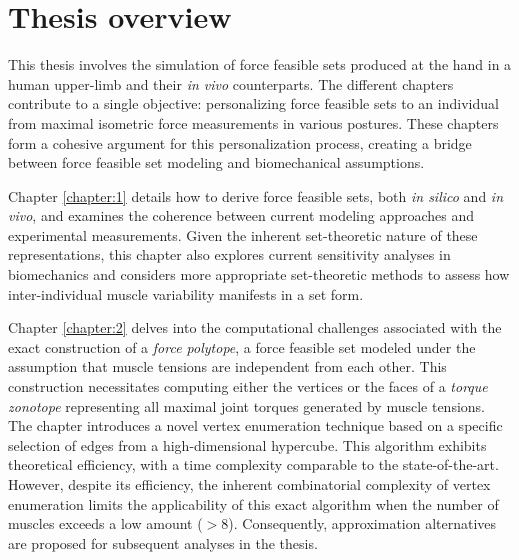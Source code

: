 \section*{Thesis overview}
This thesis involves the simulation of force feasible sets produced at the hand in a human upper-limb and their \emph{in vivo} counterparts. The different chapters contribute to a single objective: personalizing force feasible sets to an individual from maximal isometric force measurements in various postures. These chapters form a cohesive argument for this personalization process, creating a bridge between force feasible set modeling and biomechanical assumptions.

Chapter \ref{chapter:1} details how to derive force feasible sets, both \emph{in silico} and \emph{in vivo}, and examines the coherence between current modeling approaches and experimental measurements. Given the inherent set-theoretic nature of these representations, this chapter also explores current sensitivity analyses in biomechanics and considers more appropriate set-theoretic methods to assess how inter-individual muscle variability manifests in a set form.

Chapter \ref{chapter:2} delves into the computational challenges associated with the exact construction of a \emph{force polytope}, a force feasible set modeled under the assumption that muscle tensions are independent from each other. This construction necessitates computing either the vertices or the faces of a \emph{torque zonotope} representing all maximal joint torques generated by muscle tensions. The chapter introduces a novel vertex enumeration technique based on a specific selection of edges from a high-dimensional hypercube. This algorithm exhibits theoretical efficiency, with a time complexity comparable to the state-of-the-art. However, despite its efficiency, the inherent combinatorial complexity of vertex enumeration limits the applicability of this exact algorithm when the number of muscles exceeds a low amount ($>8$). Consequently, approximation alternatives are proposed for subsequent analyses in the thesis.

